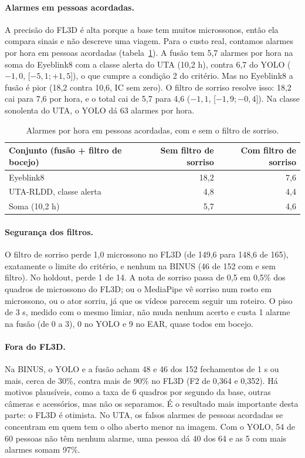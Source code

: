 \documentclass[11pt,a4paper]{article}
\newcommand{\ic}[2]{\textcolor{black!65}{[$#1$;\,$#2$]}}  %
\begin{document}
\paragraph{Alarmes em pessoas acordadas.} A precisão do FL3D é alta porque a base tem muitos microssonos, então ela compara sinais e não descreve uma viagem. Para o custo real, contamos alarmes por hora em pessoas acordadas (tabela~\ref{tab:horas}). A fusão tem 5,7 alarmes por hora na soma do Eyeblink8 com a classe alerta do UTA (10,2 h), contra 6,7 do YOLO ($-1{,}0$, \ic{-5{,}1}{+1{,}5}), o que cumpre a condição 2 do critério. Mas no Eyeblink8 a fusão é pior (18,2 contra 10,6, IC sem zero). O filtro de sorriso resolve isso: 18,2 cai para 7,6 por hora, e o total cai de 5,7 para 4,6 ($-1{,}1$, \ic{-1{,}9}{-0{,}4}). Na classe sonolenta do UTA, o YOLO dá 63 alarmes por hora.

\begin{table}[!t]
\centering\small
\caption{Alarmes por hora em pessoas acordadas, com e sem o filtro de sorriso.}
\label{tab:horas}
\begin{tabular}{@{}lrr@{}}
\toprule
Conjunto (fusão + filtro de bocejo) & Sem filtro de sorriso & Com filtro de sorriso\\
\midrule
Eyeblink8 & 18,2 & 7,6\\
UTA-RLDD, classe alerta & 4,8 & 4,4\\
Soma (10,2 h) & 5,7 & 4,6\\
\bottomrule
\end{tabular}
\end{table}

\paragraph{Segurança dos filtros.} O filtro de sorriso perde 1,0 microssono no FL3D (de 149,6 para 148,6 de 165), exatamente o limite do critério, e nenhum na BINUS (46 de 152 com e sem filtro). No holdout, perde 1 de 14. A nota de sorriso passa de 0,5 em 0,5\% dos quadros de microssono do FL3D; ou o MediaPipe vê sorriso num rosto em microssono, ou o ator sorriu, já que os vídeos parecem seguir um roteiro. O piso de 3 s, medido com o mesmo limiar, não muda nenhum acerto e custa 1 alarme na fusão (de 0 a 3), 0 no YOLO e 9 no EAR, quase todos em bocejo.

\paragraph{Fora do FL3D.} Na BINUS, o YOLO e a fusão acham 48 e 46 dos 152 fechamentos de 1 s ou mais, cerca de 30\%, contra mais de 90\% no FL3D (F2 de 0,364 e 0,352). Há motivos plausíveis, como a taxa de 6 quadros por segundo da base, outras câmeras e acessórios, mas não os separamos. É o resultado mais importante desta parte: o FL3D é otimista. No UTA, os falsos alarmes de pessoas acordadas se concentram em quem tem o olho aberto menor na imagem. Com o YOLO, 54 de 60 pessoas não têm nenhum alarme, uma pessoa dá 40 dos 64 e as 5 com mais alarmes somam 97\%.
\end{document}
